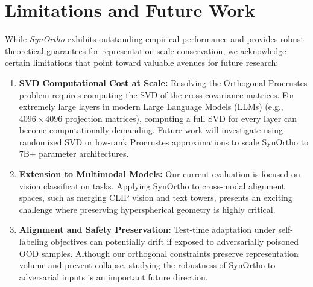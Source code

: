 \documentclass{article}
\theoremstyle{plain}
\theoremstyle{definition}
\theoremstyle{remark}
\begin{document}
\section{Limitations and Future Work}
\label{appendix-limitations}

While \textit{SynOrtho} exhibits outstanding empirical performance and provides robust theoretical guarantees for representation scale conservation, we acknowledge certain limitations that point toward valuable avenues for future research:

\begin{enumerate}
    \item \textbf{SVD Computational Cost at Scale:} Resolving the Orthogonal Procrustes problem requires computing the SVD of the cross-covariance matrices. For extremely large layers in modern Large Language Models (LLMs) (e.g., $4096 \times 4096$ projection matrices), computing a full SVD for every layer can become computationally demanding. Future work will investigate using randomized SVD or low-rank Procrustes approximations to scale SynOrtho to 7B+ parameter architectures.
    \item \textbf{Extension to Multimodal Models:} Our current evaluation is focused on vision classification tasks. Applying SynOrtho to cross-modal alignment spaces, such as merging CLIP vision and text towers, presents an exciting challenge where preserving hyperspherical geometry is highly critical.
    \item \textbf{Alignment and Safety Preservation:} Test-time adaptation under self-labeling objectives can potentially drift if exposed to adversarially poisoned OOD samples. Although our orthogonal constraints preserve representation volume and prevent collapse, studying the robustness of SynOrtho to adversarial inputs is an important future direction.
\end{enumerate}

\end{document}
